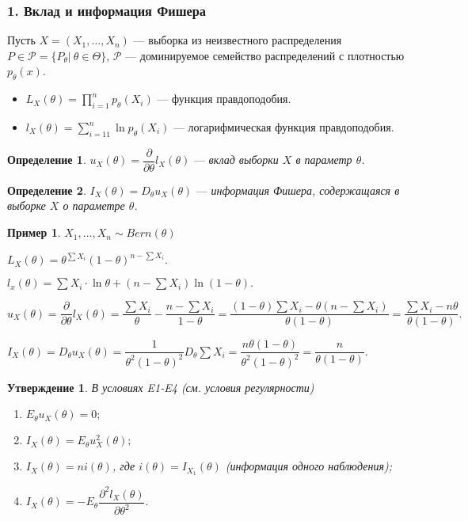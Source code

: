 \documentclass[12pt]{report}
\newtheorem{proposition}{Утверждение}
\theoremstyle{definition}
\newtheorem{definition}{Определение}
\newtheorem{example}{Пример}
\begin{document}
\subsubsection{1. Вклад и информация Фишера}
Пусть $X = (X_1, \dots, X_n)$ --- выборка из неизвестного распределения $P \in \mathcal{P} = \{P_\theta|\ \theta \in \Theta\}$,
$\mathcal{P}$ --- доминируемое семейство распределений с плотностью $p_\theta(x)$.
\begin{itemize}
	\item $L_X(\theta) = \displaystyle{\prod_{i=1}^np_\theta(X_i)}$ --- функция правдоподобия.
	\item $l_X(\theta) = \displaystyle{\sum_{i=11}^n\ln{p_\theta(X_i)}}$ --- логарифмическая функция правдоподобия.
\end{itemize}
\begin{definition}
	$u_X(\theta) = \dfrac{\partial}{\partial\theta}l_X(\theta)$ --- \emph{вклад выборки $X$ в параметр $\theta$.}
\end{definition}
\begin{definition}
	$I_X(\theta) = D_\theta u_X(\theta)$ --- \emph{информация Фишера, содержащаяся в выборке $X$ о параметре $\theta$.}
\end{definition}
\begin{example}
	$X_1, \dots, X_n \sim Bern(\theta)$

	$L_X(\theta) = \theta^{\sum X_i}(1 - \theta)^{n - \sum X_i}.$ 

	$l_x(\theta) = \sum X_i \cdot \ln{\theta} + (n - \sum X_i)\ln{(1 - \theta)}.$

	$u_X(\theta) = \dfrac{\partial}{\partial\theta}l_X(\theta) = \dfrac{\sum X_i}{\theta} - \dfrac{n - \sum X_i}{1 - \theta} = \dfrac{(1 - \theta)\sum X_i - \theta(n - \sum X_i)}{\theta(1 - \theta)} = \dfrac{\sum X_i - n\theta}{\theta(1 - \theta)}.$

	$I_X(\theta) = D_\theta u_X(\theta) = \dfrac{1}{\theta^2(1 - \theta)^2}D_\theta \sum X_i = \dfrac{n\theta(1 - \theta)}{\theta^2(1 - \theta)^2} = \dfrac{n}{\theta (1 - \theta)}.$
\end{example}
\begin{proposition}
	В условиях E1-E4 (см. условия регулярности)
	\begin{enumerate}
		\item $E_\theta u_X(\theta) = 0;$
		\item $I_X(\theta) = E_\theta u_X^2(\theta);$
		\item $I_X(\theta) = ni(\theta)$, где $i(\theta) = I_{X_1}(\theta)$ (информация одного наблюдения);
		\item $I_X(\theta) = -E_\theta\dfrac{\partial^2l_X(\theta)}{\partial\theta^2}.$
	\end{enumerate}
\end{proposition}
\end{document}

